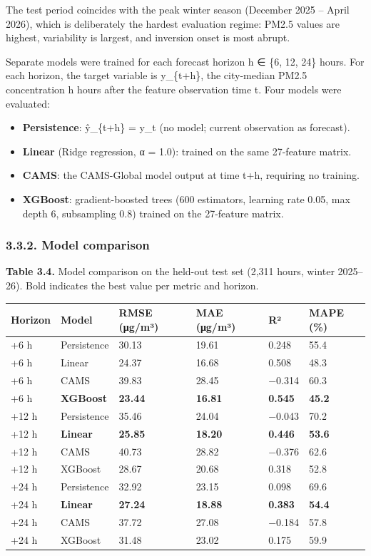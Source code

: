The test period coincides with the peak winter season (December 2025 -- April 2026), which is deliberately the hardest evaluation regime: PM2.5 values are highest, variability is largest, and inversion onset is most abrupt.

Separate models were trained for each forecast horizon h ∈ \{6, 12, 24\} hours. For each horizon, the target variable is y\_\{t+h\}, the city-median PM2.5 concentration h hours after the feature observation time t. Four models were evaluated:

\begin{itemize}
\tightlist
\item
  \textbf{Persistence}: ŷ\_\{t+h\} = y\_t (no model; current observation as forecast).
\item
  \textbf{Linear} (Ridge regression, α = 1.0): trained on the same 27-feature matrix.
\item
  \textbf{CAMS}: the CAMS-Global model output at time t+h, requiring no training.
\item
  \textbf{XGBoost}: gradient-boosted trees (600 estimators, learning rate 0.05, max depth 6, subsampling 0.8) trained on the 27-feature matrix.
\end{itemize}

\subsubsection{3.3.2. Model comparison}\label{model-comparison}

\textbf{Table 3.4.} Model comparison on the held-out test set (2,311 hours, winter 2025--26). Bold indicates the best value per metric and horizon.

\begin{longtable}[]{@{}llllll@{}}
\toprule\noalign{}
Horizon & Model & RMSE (μg/m³) & MAE (μg/m³) & R² & MAPE (\%) \\
\midrule\noalign{}
\endhead
\bottomrule\noalign{}
\endlastfoot
+6 h & Persistence & 30.13 & 19.61 & 0.248 & 55.4 \\
+6 h & Linear & 24.37 & 16.68 & 0.508 & 48.3 \\
+6 h & CAMS & 39.83 & 28.45 & −0.314 & 60.3 \\
+6 h & \textbf{XGBoost} & \textbf{23.44} & \textbf{16.81} & \textbf{0.545} & \textbf{45.2} \\
+12 h & Persistence & 35.46 & 24.04 & −0.043 & 70.2 \\
+12 h & \textbf{Linear} & \textbf{25.85} & \textbf{18.20} & \textbf{0.446} & \textbf{53.6} \\
+12 h & CAMS & 40.73 & 28.82 & −0.376 & 62.6 \\
+12 h & XGBoost & 28.67 & 20.68 & 0.318 & 52.8 \\
+24 h & Persistence & 32.92 & 23.15 & 0.098 & 69.6 \\
+24 h & \textbf{Linear} & \textbf{27.24} & \textbf{18.88} & \textbf{0.383} & \textbf{54.4} \\
+24 h & CAMS & 37.72 & 27.08 & −0.184 & 57.8 \\
+24 h & XGBoost & 31.48 & 23.02 & 0.175 & 59.9 \\
\end{longtable}


